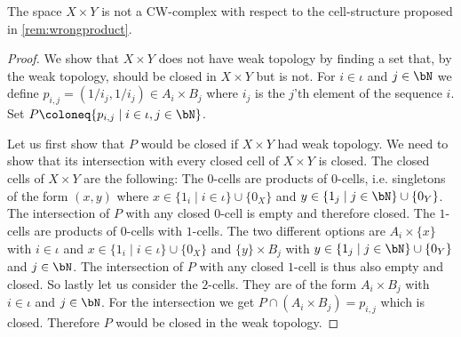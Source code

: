 \begin{lem} \label{lem:proofofcounter}
    The space $X \times Y$ is not a CW-complex with respect to the cell-structure proposed in \ref{rem:wrongproduct}.
\end{lem}
\begin{proof}
    We show that $X \times Y$ does not have weak topology by finding a set that, by the weak topology, should be closed in $X \times Y$ but is not. 
    For $i \in \iota$ and $j \in \bN$ we define $p_{i,j} = (1/i_j, 1 /i_j) \in A_i \times B_j$ where $i_j$ is the $j$'th element of the sequence $i$.
    Set $P \coloneq \{ p_{i, j} \mid i \in \iota, j \in \bN\}$.
    
    Let us first show that $P$ would be closed if $X \times Y$ had weak topology. We need to show that its intersection with every closed cell of $X \times Y$ is closed.
    The closed cells of $X \times Y$ are the following: 
    The $0$-cells are products of $0$-cells, i.e. singletons of the form $(x, y)$ where $x \in \{1_i \mid i \in \iota\} \cup \{0_X\}$ and $y \in \{1_j \mid j \in \bN\} \cup \{0_Y\}$. The intersection of $P$ with any closed $0$-cell is empty and therefore closed. 
    The $1$-cells are products of $0$-cells with $1$-cells. The two different options are $A_i \times \{x\}$ with $i \in \iota$ and $x \in \{1_i \mid i \in \iota\} \cup \{0_X\}$ and $\{y\} \times B_j$ with $y \in \{1_j \mid j \in \bN\} \cup \{0_Y\}$ and $j \in \bN$. The intersection of $P$ with any closed $1$-cell is thus also empty and closed. 
    So lastly let us consider the $2$-cells. They are of the form $A_i \times B_j$ with $i \in \iota$ and $j \in \bN$. For the intersection we get $P \cap (A_i \times B_j) = p_{i, j}$ which is closed. 
    Therefore $P$ would be closed in the weak topology. 


\end{proof}
